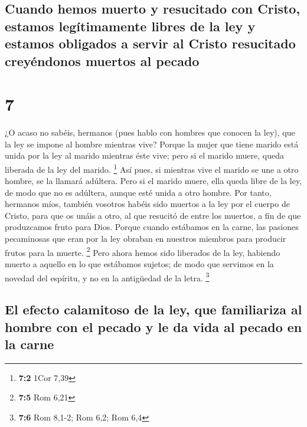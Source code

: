 \hypertarget{cuando-hemos-muerto-y-resucitado-con-cristo-estamos-leguxedtimamente-libres-de-la-ley-y-estamos-obligados-a-servir-al-cristo-resucitado-creyuxe9ndonos-muertos-al-pecado}{%
\subsection{Cuando hemos muerto y resucitado con Cristo, estamos
legítimamente libres de la ley y estamos obligados a servir al Cristo
resucitado creyéndonos muertos al
pecado}\label{cuando-hemos-muerto-y-resucitado-con-cristo-estamos-leguxedtimamente-libres-de-la-ley-y-estamos-obligados-a-servir-al-cristo-resucitado-creyuxe9ndonos-muertos-al-pecado}}

\hypertarget{section-6}{%
\section{7}\label{section-6}}

 ¿O acaso no sabéis, hermanos (pues hablo con hombres que
conocen la ley), que la ley se impone al hombre mientras vive?
 Porque la mujer que tiene marido está unida por la ley al
marido mientras éste vive; pero si el marido muere, queda liberada de la
ley del marido. \footnote{\textbf{7:2} 1Cor 7,39}  Así
pues, si mientras vive el marido se une a otro hombre, se la llamará
adúltera. Pero si el marido muere, ella queda libre de la ley, de modo
que no es adúltera, aunque esté unida a otro hombre.  Por
tanto, hermanos míos, también vosotros habéis sido muertos a la ley por
el cuerpo de Cristo, para que os unáis a otro, al que resucitó de entre
los muertos, a fin de que produzcamos fruto para Dios. 
Porque cuando estábamos en la carne, las pasiones pecaminosas que eran
por la ley obraban en nuestros miembros para producir frutos para la
muerte. \footnote{\textbf{7:5} Rom 6,21}  Pero ahora hemos
sido liberados de la ley, habiendo muerto a aquello en lo que estábamos
sujetos; de modo que servimos en la novedad del espíritu, y no en la
antigüedad de la letra. \footnote{\textbf{7:6} Rom 8,1-2; Rom 6,2; Rom
  6,4}

\hypertarget{el-efecto-calamitoso-de-la-ley-que-familiariza-al-hombre-con-el-pecado-y-le-da-vida-al-pecado-en-la-carne}{%
\subsection{El efecto calamitoso de la ley, que familiariza al hombre
con el pecado y le da vida al pecado en la
carne}\label{el-efecto-calamitoso-de-la-ley-que-familiariza-al-hombre-con-el-pecado-y-le-da-vida-al-pecado-en-la-carne}}

